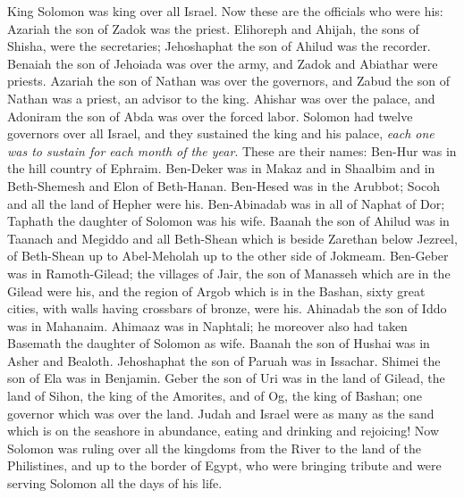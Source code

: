 \begin{biblechapter} %
 King Solomon was king over all Israel.
\verse Now these are the officials who were his: Azariah the son of Zadok was the priest.
\verse Elihoreph and Ahijah, the sons of Shisha, were the secretaries; Jehoshaphat the son of Ahilud was the recorder.
\verse Benaiah the son of Jehoiada was over the army, and Zadok and Abiathar were priests.
\verse Azariah the son of Nathan was over the governors, and Zabud the son of Nathan was a priest, an advisor to the king.
\verse Ahishar was over the palace, and Adoniram the son of Abda was over the forced labor.
\verse Solomon had twelve governors over all Israel, and they sustained the king and his palace, \textit{each one was to sustain for each month of the year}.
\verse These are their names: Ben-Hur was in the hill country of Ephraim.
\verse Ben-Deker was in Makaz and in Shaalbim and in Beth-Shemesh and Elon of Beth-Hanan.
\verse Ben-Hesed was in the Arubbot; Socoh and all the land of Hepher were his.
\verse Ben-Abinadab was in all of Naphat of Dor; Taphath the daughter of Solomon was his wife.
\verse Baanah the son of Ahilud was in Taanach and Megiddo and all Beth-Shean which is beside Zarethan below Jezreel, of Beth-Shean up to Abel-Meholah up to the other side of Jokmeam.
\verse Ben-Geber was in Ramoth-Gilead; the villages of Jair, the son of Manasseh which are in the Gilead were his, and the region of Argob which is in the Bashan, sixty great cities, with walls having crossbars of bronze, were his.
\verse Ahinadab the son of Iddo was in Mahanaim.
\verse Ahimaaz was in Naphtali; he moreover also had taken Basemath the daughter of Solomon as wife.
\verse Baanah the son of Hushai was in Asher and Bealoth.
\verse Jehoshaphat the son of Paruah was in Issachar.
\verse Shimei the son of Ela was in Benjamin.
\verse Geber the son of Uri was in the land of Gilead, the land of Sihon, the king of the Amorites, and of Og, the king of Bashan; one governor which was over the land.
\verse Judah and Israel were as many as the sand which is on the seashore in abundance, eating and drinking and rejoicing!
  Now Solomon was ruling over all the kingdoms from the River to the land of the Philistines, and up to the border of Egypt, who were bringing tribute and were serving Solomon all the days of his life.

\end{biblechapter}
